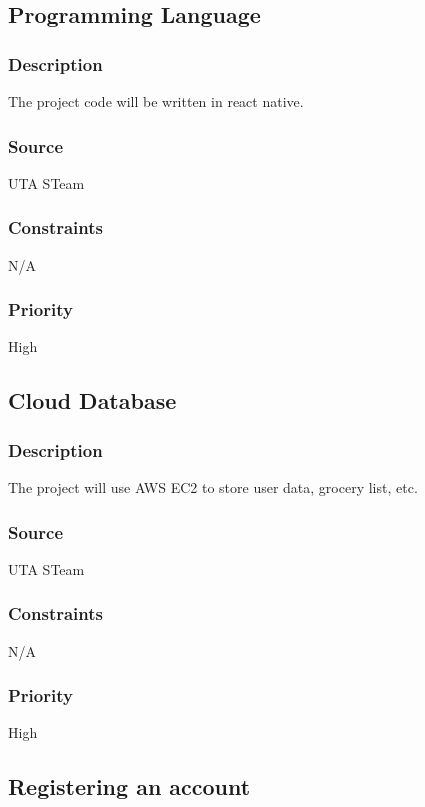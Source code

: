 
\subsection{Programming Language}
\subsubsection{Description}
The project code will be written in react native.
\subsubsection{Source}
UTA STeam
\subsubsection{Constraints}
N/A
\subsubsection{Priority}
High
\subsection{Cloud Database}
\subsubsection{Description}
The project will use AWS EC2 to store user data, grocery list, etc. 
\subsubsection{Source}
UTA STeam
\subsubsection{Constraints}
N/A
\subsubsection{Priority}
High
\subsection{Registering an account}

